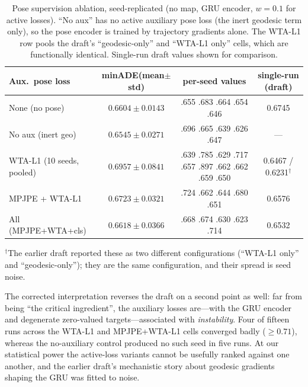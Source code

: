 \documentclass{article} %
\newcommand{\minADE}{minADE\xspace}
\begin{document}
\begin{table}[t]
\caption{Pose supervision ablation, seed-replicated (no map, GRU encoder,
$w{=}0.1$ for active losses). ``No aux'' has no active auxiliary pose loss (the
inert geodesic term only), so the pose encoder is trained by trajectory gradients
alone. The WTA-L1 row pools the draft's ``geodesic-only'' and ``WTA-L1 only''
cells, which are functionally identical. Single-run draft values shown for
comparison.}
\label{tab:loss_ablation}
\begin{center}
\footnotesize
\setlength{\tabcolsep}{3.5pt}
\begin{tabular}{lccc}
\toprule
Aux.\ pose loss & \minADE (mean$\pm$std) & per-seed values & single-run (draft) \\
\midrule
None (no pose)        & $0.6604 \pm 0.0143$ & .655 .683 .664 .654 .646 & 0.6745 \\
No aux (inert geo)    & $0.6545 \pm 0.0271$ & .696 .665 .639 .626 .647 & --- \\
WTA-L1 (10 seeds, pooled) & $0.6957 \pm 0.0841$ & .639 .785 .629 .717 .657 .897 .662 .662 .659 .650 & 0.6467 / 0.6231$^{\dagger}$ \\
MPJPE + WTA-L1        & $0.6723 \pm 0.0321$ & .724 .662 .644 .680 .651 & 0.6576 \\
All (MPJPE+WTA+cls)   & $0.6618 \pm 0.0366$ & .668 .674 .630 .623 .714 & 0.6532 \\
\bottomrule
\end{tabular}
\end{center}
{\footnotesize $^{\dagger}$The earlier draft reported these as two different
configurations (``WTA-L1 only'' and ``geodesic-only''); they are the same
configuration, and their spread is seed noise.}
\end{table}

The corrected interpretation reverses the draft on a second point as well: far
from being ``the critical ingredient'', the auxiliary losses are---with the GRU
encoder and degenerate zero-valued targets---associated with \emph{instability}.
Four of fifteen runs across the WTA-L1 and MPJPE+WTA-L1 cells converged badly
($\geq 0.71$), whereas the no-auxiliary control produced no such seed in five
runs. At our statistical power the active-loss variants cannot be usefully ranked
against one another, and the earlier draft's mechanistic story about geodesic
gradients shaping the GRU was fitted to noise.
\end{document}

